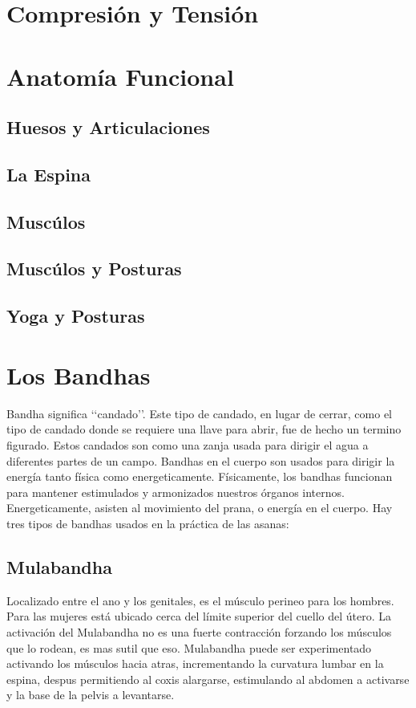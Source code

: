 \section{Compresión y Tensión}
\section{Anatomía Funcional}
\subsection{Huesos y Articulaciones}
\subsection{La Espina}
\subsection{Muscúlos}
\subsection{Muscúlos y Posturas}
\subsection{Yoga y Posturas}
\newpage
\section{Los Bandhas}
Bandha significa \lq\lq candado\rq\rq. Este tipo de candado, en lugar de cerrar, como el tipo de candado donde se requiere una llave para abrir, fue de hecho un termino figurado. Estos candados son como una zanja usada para dirigir el agua a diferentes partes de un campo. Bandhas en el cuerpo son usados para dirigir la energía tanto física como energeticamente. Físicamente, los bandhas funcionan para mantener estimulados y armonizados nuestros órganos internos. Energeticamente, asisten al movimiento del prana, o energía en el cuerpo. Hay tres tipos de bandhas usados en la práctica de las asanas:

\subsection{Mulabandha}
Localizado entre el ano y los genitales, es el músculo perineo para los hombres. Para las mujeres está ubicado cerca del límite superior del cuello del útero. La activación del Mulabandha no es una fuerte contracción forzando los músculos que lo rodean, es mas sutil que eso. Mulabandha puede ser experimentado activando los músculos hacia atras, incrementando la curvatura lumbar en la espina, despus permitiendo al coxis alargarse, estimulando al abdomen a activarse y la base de la pelvis a levantarse.

